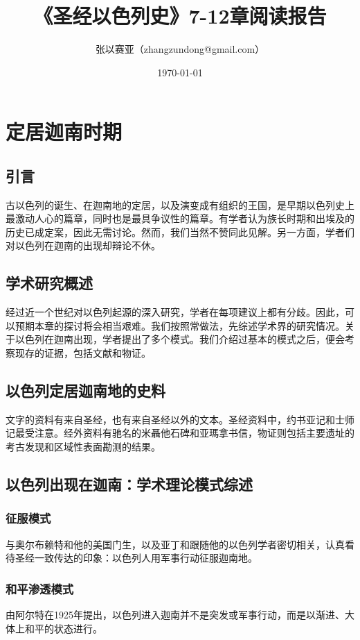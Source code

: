 \documentclass[12pt, a4paper]{ctexart}
\title{《圣经以色列史》7-12章阅读报告}
\author{张以赛亚（zhangzundong@gmail.com）}
\date{\today}
\begin{document}

\tableofcontents
\newpage
\setcounter{section}{6} %
\section{定居迦南时期}
\subsection{引言}
古以色列的诞生、在迦南地的定居，以及演变成有组织的王国，是早期以色列史上最激动人心的篇章，同时也是最具争议性的篇章。有学者认为族长时期和出埃及的历史已成定案，因此无需讨论。然而，我们当然不赞同此见解。另一方面，学者们对以色列在迦南的出现却辩论不休。

\subsection{学术研究概述}
经过近一个世纪对以色列起源的深入研究，学者在每项建议上都有分歧。因此，可以预期本章的探讨将会相当艰难。我们按照常做法，先综述学术界的研究情况。关于以色列在迦南出现，学者提出了多个模式。我们介绍过基本的模式之后，便会考察现存的证据，包括文献和物证。

\subsection{以色列定居迦南地的史料}
文字的资料有来自圣经，也有来自圣经以外的文本。圣经资料中，约书亚记和士师记最受注意。经外资料有驰名的米聶他石碑和亚瑪拿书信，物证则包括主要遗址的考古发现和区域性表面勘测的结果。

\subsection{以色列出现在迦南：学术理论模式综述}
\subsubsection{征服模式}
与奥尔布赖特和他的美国门生，以及亚丁和跟随他的以色列学者密切相关，认真看待圣经一致传达的印象：以色列人用军事行动征服迦南地。
\subsubsection{和平渗透模式}
由阿尔特在1925年提出，以色列进入迦南并不是突发或军事行动，而是以渐进、大体上和平的状态进行。
\end{document}
